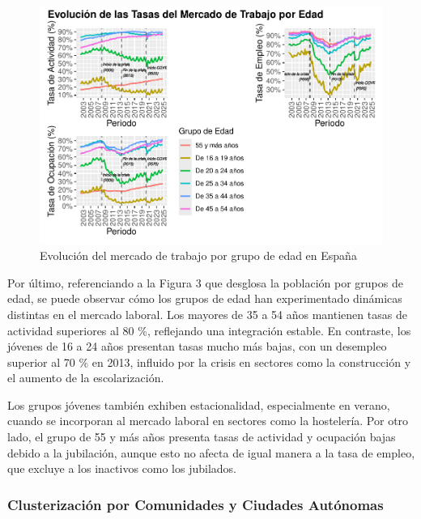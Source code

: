 \documentclass[Universitat de
València,article,submit,moreauthors,pdftex]{Definitions/mdpi}
\begin{document}
\begin{figure}[h]

{\centering \includegraphics[width=1\linewidth]{ProyectoAED2024_files/figure-latex/unnamed-chunk-30-1} 

}

\caption{Evolución del mercado de trabajo por grupo de edad en España}\label{fig:unnamed-chunk-30}
\end{figure}

Por último, referenciando a la Figura 3 que desglosa la población por
grupos de edad, se puede observar cómo los grupos de edad han
experimentado dinámicas distintas en el mercado laboral. Los mayores de
35 a 54 años mantienen tasas de actividad superiores al 80 \%,
reflejando una integración estable. En contraste, los jóvenes de 16 a 24
años presentan tasas mucho más bajas, con un desempleo superior al 70 \%
en 2013, influido por la crisis en sectores como la construcción y el
aumento de la escolarización.

Los grupos jóvenes también exhiben estacionalidad, especialmente en
verano, cuando se incorporan al mercado laboral en sectores como la
hostelería. Por otro lado, el grupo de 55 y más años presenta tasas de
actividad y ocupación bajas debido a la jubilación, aunque esto no
afecta de igual manera a la tasa de empleo, que excluye a los inactivos
como los jubilados.

\subsubsection{\texorpdfstring{\textbf{Clusterización por Comunidades y
Ciudades
Autónomas}}{Clusterización por Comunidades y Ciudades Autónomas}}\label{clusterizaciuxf3n-por-comunidades-y-ciudades-autuxf3nomas}
\end{document}
